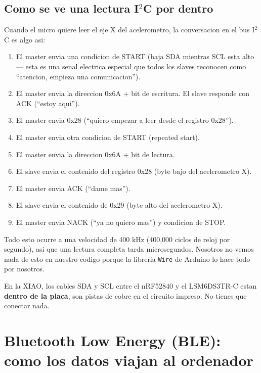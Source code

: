 \documentclass[11pt,a4paper]{article}
\begin{document}
\subsection{Como se ve una lectura I$^2$C por dentro}

Cuando el micro quiere leer el eje X del acelerometro, la
conversacion en el bus I$^2$C es algo asi:

\begin{enumerate}
    \item El master envia una condicion de START (baja SDA mientras
          SCL esta alto --- esta es una senal electrica especial
          que todos los slaves reconocen como ``atencion, empieza
          una comunicacion'').
    \item El master envia la direccion 0x6A + bit de escritura.
          El slave responde con ACK (``estoy aqui'').
    \item El master envia 0x28 (``quiero empezar a leer desde el
          registro 0x28'').
    \item El master envia otra condicion de START (repeated start).
    \item El master envia la direccion 0x6A + bit de lectura.
    \item El slave envia el contenido del registro 0x28 (byte bajo
          del acelerometro X).
    \item El master envia ACK (``dame mas'').
    \item El slave envia el contenido de 0x29 (byte alto del
          acelerometro X).
    \item El master envia NACK (``ya no quiero mas'') y condicion
          de STOP.
\end{enumerate}

Todo esto ocurre a una velocidad de 400 kHz (400,000 ciclos de
reloj por segundo), asi que una lectura completa tarda
microsegundos. Nosotros no vemos nada de esto en nuestro codigo
porque la libreria \texttt{Wire} de Arduino lo hace todo por
nosotros.

En la XIAO, los cables SDA y SCL entre el nRF52840 y el LSM6DS3TR-C
estan \textbf{dentro de la placa}, son pistas de cobre en el
circuito impreso. No tienes que conectar nada.


\section{Bluetooth Low Energy (BLE): como los datos viajan al ordenador}
\end{document}
